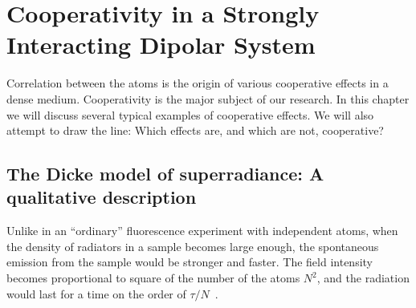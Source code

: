 \chapter{Cooperativity in a Strongly Interacting Dipolar System}

Correlation between the atoms is the origin of various cooperative effects in a dense medium. %
Cooperativity is the major subject of our research. In this chapter we will discuss several typical examples of cooperative effects. We will also attempt to draw the line: Which effects are, and which are not, cooperative?

\section{The Dicke model of superradiance: A qualitative description}
\label{DICKESTORY}
Unlike in an ``ordinary'' fluorescence experiment with independent atoms, when the density of radiators in a sample becomes large enough, the spontaneous emission from the sample would be stronger and faster.  The field intensity becomes proportional to square of the number of the atoms $N^2$, and the radiation would last for a time on the order of $\tau/N$~\cite{0038-5670-23-8-R04,1982PhR....93..301G}. 

